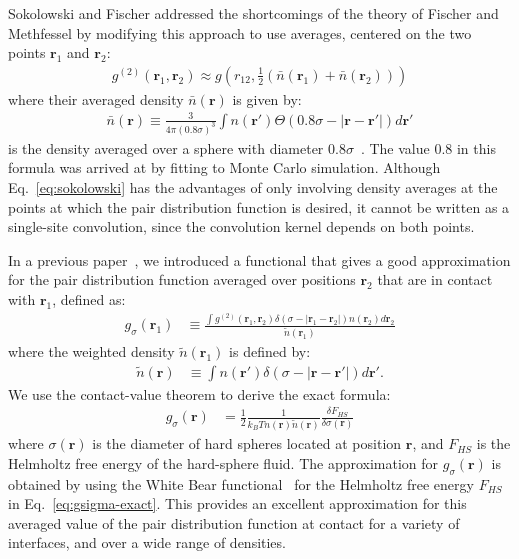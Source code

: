 \documentclass[letterpaper,twocolumn,amsmath,amssymb,pre,aps,10pt]{revtex4-1}
\newcommand{\rr}{\textbf{r}}
\begin{document}
Sokolowski and Fischer addressed the shortcomings of the theory of
Fischer and Methfessel by modifying this approach to use
averages, centered on the two points $\rr_1$ and $\rr_2$:
\begin{align}
  g^{(2)}(\rr_1,\rr_2) \approx g\left(r_{12},
  \tfrac12(\bar{n}(\rr_1)+\bar{n}(\rr_2))\right)
  \label{eq:sokolowski}
\end{align}
where their averaged density $\bar{n}(\rr)$ is given by:
\begin{align}
  \bar{n}(\rr) \equiv \frac{3}{4\pi (0.8\sigma)^3}\int n(\rr')\Theta(0.8\sigma - |\rr-\rr'|) d\rr'
\end{align}
is the density averaged over a sphere with diameter
$0.8\sigma$~\cite{sokolowski1992role, wadewitz2000application, winkelmann2001liquid}.  The
value 0.8 in this formula was arrived at by fitting to Monte Carlo
simulation.  Although Eq.~\ref{eq:sokolowski} has the advantages of
only involving density averages at the points at which the pair
distribution function is desired, it cannot be written as a
single-site convolution, since the convolution kernel depends on both
points.

In a previous paper~\cite{schulte2012using}, we introduced a
functional that gives a good approximation for the pair distribution
function averaged over positions $\rr_2$ that are in contact with
$\rr_1$, defined as:
\begin{align}
  g_\sigma(\rr_1) &\equiv \frac{ \int g^{(2)}(\rr_1,\rr_2) \delta(\sigma -|\rr_1-\rr_2|)n(\rr_2)
    d\rr_2 }{ \tilde{n}(\rr_1)  }
\end{align}
where the weighted density $\tilde{n}(\rr_1)$ is defined by:
\begin{align}
  \tilde{n}(\rr) &\equiv \int n(\rr') \delta(\sigma -|\rr - \rr'|)d\rr'.
\end{align}
We use the contact-value theorem to derive the exact formula:
\begin{align}
  g_\sigma(\rr)%
  &= \frac12 \frac{1}{k_BT n(\rr) \tilde{n}(\rr)} \frac{\delta
    F_{HS}}{\delta \sigma(\mathbf{r})} \label{eq:gsigma-exact}
\end{align}
where $\sigma(\rr)$ is the diameter of hard spheres located at
position $\rr$, and $F_{HS}$ is the Helmholtz free energy of the
hard-sphere fluid.  The approximation for $g_\sigma(\rr)$ is obtained
by using the White Bear functional~\cite{roth2002whitebear} for the
Helmholtz free energy $F_{HS}$ in Eq.~\ref{eq:gsigma-exact}.  This
provides an excellent approximation for this averaged value of the
pair distribution function at contact for a variety of interfaces, and
over a wide range of densities.
\end{document}
